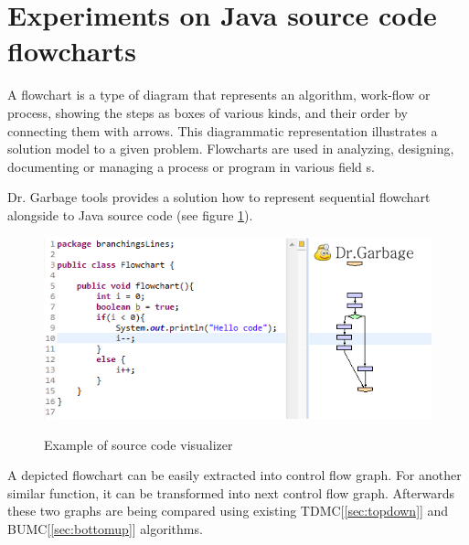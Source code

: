 \documentclass{report}
\begin{document}
\section{Experiments on Java source code flowcharts}

A flowchart is a type of diagram that represents an algorithm, work-flow or process, showing the steps as boxes of various kinds, and their order by connecting them with arrows. This diagrammatic representation illustrates a solution model to a given problem. Flowcharts are used in analyzing, designing, documenting or managing a process or program in various field s\cite{wiki_flowchart}.

Dr. Garbage tools \cite{drgarbage} provides a solution how to represent sequential flowchart alongside to Java source code (see figure \ref{fig:java-flowchart-example}).
\begin{figure}[h]
  \centering
  \includegraphics[scale = 0.65]{Figures/Java-flowchart-exp/java-flowchart-example.png}\\[0.1cm]
  \caption[Java flowchart diagram opened in java source-code visualizer]{Example of source code visualizer}
  \label{fig:java-flowchart-example}
\end{figure}

A depicted flowchart can be easily extracted into control flow graph. For another similar function, it can be transformed into next control flow graph. Afterwards these two graphs are being compared using existing TDMC[\ref{sec:topdown}] and BUMC[\ref{sec:bottomup}] algorithms. 
\end{document}
